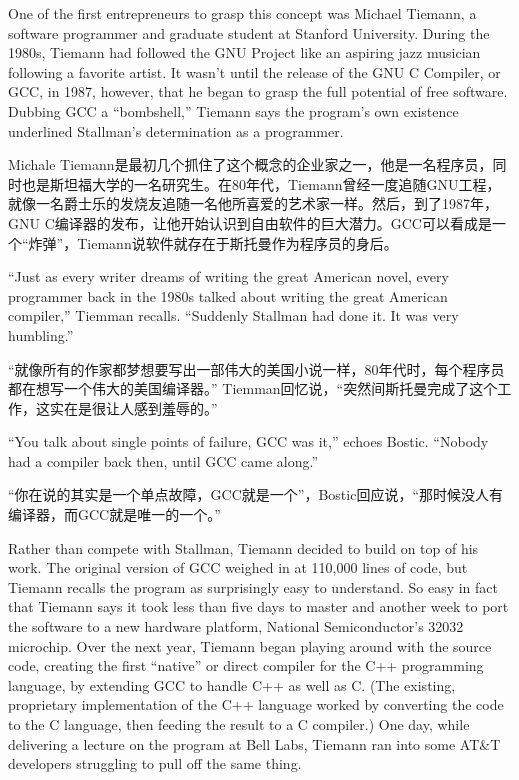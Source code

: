 \ifdefined\eng
One of the first entrepreneurs to grasp this concept was Michael Tiemann, a software programmer and graduate student at Stanford University. During the 1980s, Tiemann had followed the GNU Project like an aspiring jazz musician following a favorite artist. It wasn't until the release of the GNU C Compiler, or GCC, in 1987, however, that he began to grasp the full potential of free software. Dubbing GCC a ``bombshell,'' Tiemann says the program's own existence underlined Stallman's determination as a programmer.
\fi

\ifdefined\chs
Michale Tiemann是最初几个抓住了这个概念的企业家之一，他是一名程序员，同时也是斯坦福大学的一名研究生。在80年代，Tiemann曾经一度追随GNU工程，就像一名爵士乐的发烧友追随一名他所喜爱的艺术家一样。然后，到了1987年，GNU C编译器的发布，让他开始认识到自由软件的巨大潜力。GCC可以看成是一个``炸弹''，Tiemann说软件就存在于斯托曼作为程序员的身后。
\fi

\ifdefined\eng
``Just as every writer dreams of writing the great American novel, every programmer back in the 1980s talked about writing the great American compiler,'' Tiemman recalls. ``Suddenly Stallman had done it. It was very humbling.''
\fi

\ifdefined\chs
``就像所有的作家都梦想要写出一部伟大的美国小说一样，80年代时，每个程序员都在想写一个伟大的美国编译器。'' Tiemman回忆说，``突然间斯托曼完成了这个工作，这实在是很让人感到羞辱的。''
\fi

\ifdefined\eng
``You talk about single points of failure, GCC was it,'' echoes Bostic. ``Nobody had a compiler back then, until GCC came along.''
\fi

\ifdefined\chs
``你在说的其实是一个单点故障，GCC就是一个''，Bostic回应说，``那时候没人有编译器，而GCC就是唯一的一个。''
\fi

\ifdefined\eng
Rather than compete with Stallman, Tiemann decided to build on top of his work. The original version of GCC weighed in at 110,000 lines of code, but Tiemann recalls the program as surprisingly easy to understand. So easy in fact that Tiemann says it took less than five days to master and another week to port the software to a new hardware platform, National Semiconductor's 32032 microchip. Over the next year, Tiemann began playing around with the source code, creating the first ``native'' or direct compiler for the C++ programming language, by extending GCC to handle C++ as well as C. (The existing, proprietary implementation of the C++ language worked by converting the code to the C language, then feeding the result to a C compiler.) One day, while delivering a lecture on the program at Bell Labs, Tiemann ran into some AT\&T developers struggling to pull off the same thing.
\fi

